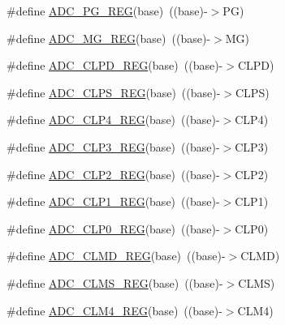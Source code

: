 \begin{DoxyCompactItemize}
\item 
\#define \hyperlink{group___a_d_c___register___accessor___macros_gaebde0a554847713040cf0c43115d809b}{A\+D\+C\+\_\+\+P\+G\+\_\+\+R\+EG}(base)~((base)-\/$>$PG)
\item 
\#define \hyperlink{group___a_d_c___register___accessor___macros_gadf3a31c44266561932604677fa2e0103}{A\+D\+C\+\_\+\+M\+G\+\_\+\+R\+EG}(base)~((base)-\/$>$MG)
\item 
\#define \hyperlink{group___a_d_c___register___accessor___macros_ga59c18d80d2f1650011b4e7ab4a78082f}{A\+D\+C\+\_\+\+C\+L\+P\+D\+\_\+\+R\+EG}(base)~((base)-\/$>$C\+L\+PD)
\item 
\#define \hyperlink{group___a_d_c___register___accessor___macros_ga2a3bbcd45b1d248c8c1bf03cd69a5ca3}{A\+D\+C\+\_\+\+C\+L\+P\+S\+\_\+\+R\+EG}(base)~((base)-\/$>$C\+L\+PS)
\item 
\#define \hyperlink{group___a_d_c___register___accessor___macros_gaa036848fc8ca95617243eed3106b88ff}{A\+D\+C\+\_\+\+C\+L\+P4\+\_\+\+R\+EG}(base)~((base)-\/$>$C\+L\+P4)
\item 
\#define \hyperlink{group___a_d_c___register___accessor___macros_ga90fd9546a4baed0bb3310256151eab47}{A\+D\+C\+\_\+\+C\+L\+P3\+\_\+\+R\+EG}(base)~((base)-\/$>$C\+L\+P3)
\item 
\#define \hyperlink{group___a_d_c___register___accessor___macros_ga59b503ad646bea3c6f9496a0845c5618}{A\+D\+C\+\_\+\+C\+L\+P2\+\_\+\+R\+EG}(base)~((base)-\/$>$C\+L\+P2)
\item 
\#define \hyperlink{group___a_d_c___register___accessor___macros_ga2cb9a9c57990869bcdd2a906bb500ab5}{A\+D\+C\+\_\+\+C\+L\+P1\+\_\+\+R\+EG}(base)~((base)-\/$>$C\+L\+P1)
\item 
\#define \hyperlink{group___a_d_c___register___accessor___macros_ga34e45f740cbe3d74b8024f94e3b1288c}{A\+D\+C\+\_\+\+C\+L\+P0\+\_\+\+R\+EG}(base)~((base)-\/$>$C\+L\+P0)
\item 
\#define \hyperlink{group___a_d_c___register___accessor___macros_ga412c1dd72113c5718cf0868df32b93d4}{A\+D\+C\+\_\+\+C\+L\+M\+D\+\_\+\+R\+EG}(base)~((base)-\/$>$C\+L\+MD)
\item 
\#define \hyperlink{group___a_d_c___register___accessor___macros_gac5b2214b1d9c827e78e531fa50f01116}{A\+D\+C\+\_\+\+C\+L\+M\+S\+\_\+\+R\+EG}(base)~((base)-\/$>$C\+L\+MS)
\item 
\#define \hyperlink{group___a_d_c___register___accessor___macros_ga2450c7724303c1db5fac00c810437e4c}{A\+D\+C\+\_\+\+C\+L\+M4\+\_\+\+R\+EG}(base)~((base)-\/$>$C\+L\+M4)
\item 

\end{DoxyCompactItemize}
